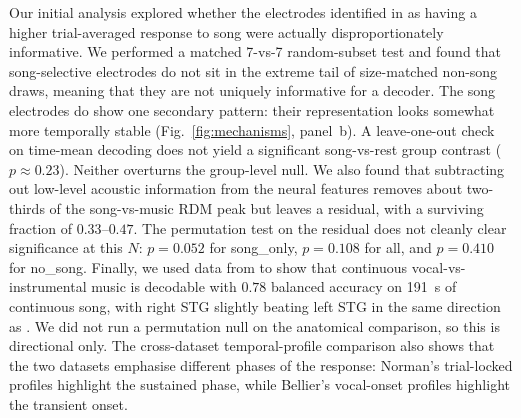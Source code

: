 \documentclass[11pt]{article}
\begin{document}
Our initial analysis explored whether the electrodes identified in \citet{NormanHaignere2022} as having a higher trial-averaged response to song were actually disproportionately informative. We performed a matched 7-vs-7 random-subset test and found that song-selective electrodes do not sit in the extreme tail of size-matched non-song draws, meaning that they are not uniquely informative for a decoder. The song electrodes do show one secondary pattern: their representation looks somewhat more temporally stable (Fig.~\ref{fig:mechanisms}, panel~b). A leave-one-out check on time-mean decoding does not yield a significant song-vs-rest group contrast ($p \approx 0.23$). Neither overturns the group-level null. We also found that subtracting out low-level acoustic information from the neural features removes about two-thirds of the song-vs-music RDM peak but leaves a residual, with a surviving fraction of $0.33$--$0.47$. The permutation test on the residual does not cleanly clear significance at this $N$: $p = 0.052$ for \textsf{song\_only}, $p = 0.108$ for \textsf{all}, and $p = 0.410$ for \textsf{no\_song}. Finally, we used data from \citet{Bellier2023} to show that continuous vocal-vs-instrumental music is decodable with $0.78$ balanced accuracy on 191~s of continuous song, with right STG slightly beating left STG in the same direction as \citet{Bellier2023}. We did not run a permutation null on the anatomical comparison, so this is directional only. The cross-dataset temporal-profile comparison also shows that the two datasets emphasise different phases of the response: Norman's trial-locked profiles highlight the sustained phase, while Bellier's vocal-onset profiles highlight the transient onset.
\end{document}

